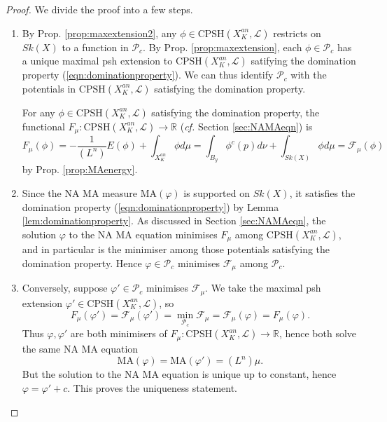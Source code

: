 \documentclass[a4paper]{article}
\theoremstyle{definition}
\newcommand{\cf}{\emph{cf.} }
\newcommand{\R}{\mathbb{R}}
\begin{document}
		
\begin{proof}
We divide the proof into a few steps.

\begin{enumerate}
	\item  By Prop. \ref{prop:maxextension2},  any $\phi\in \text{CPSH}(X_K^{an},\mathcal{L})$ restricts on $Sk(X)$ to a function in $\mathcal{P}_c$. By Prop. \ref{prop:maxextension}, each $\phi\in \mathcal{P}_c$ has a unique maximal psh extension to $\text{CPSH}(X_K^{an},\mathcal{L})$ satifying the domination property (\ref{eqn:dominationproperty}). We can thus identify $\mathcal{P}_c$ with the potentials in $\text{CPSH}(X_K^{an},\mathcal{L})$ satisfying the domination property.
	
	
	
  For any $\phi\in \text{CPSH}(X_K^{an},\mathcal{L})$ satisfying the domination property, 
	the functional  $F_\mu: \text{CPSH}(X_K^{an},\mathcal{L})\to \R$ (\cf Section \ref{sec:NAMAeqn}) is
	\[
F_{\mu}(\phi)= -  \frac{1}{(L^n)} E(\phi)+ \int_{X_K^{an}} \phi d\mu =  \int_{B_y}  \phi^c(p)   d\nu + \int_{Sk(X)} \phi d\mu =\mathcal{F}_\mu(\phi)
	\]
by Prop. \ref{prop:MAenergy}.
	
	
	
	
	\item 
	Since the NA MA measure $\text{MA}(\varphi)$ is supported on $Sk(X)$, it satisfies the domination property (\ref{eqn:dominationproperty}) by Lemma \ref{lem:dominationproperty}. As discussed in Section \ref{sec:NAMAeqn}, the solution $\varphi$ to the NA MA equation minimises  $F_\mu$ among $ \text{CPSH}(X_K^{an},\mathcal{L})$, and in particular is the minimiser among those potentials satisfying the domination property. Hence $\varphi\in \mathcal{P}_c$ minimises $\mathcal{F}_\mu$ among $\mathcal{P}_c$. 
	
	
	\item Conversely, suppose $\varphi'\in \mathcal{P}_c$ minimises $\mathcal{F}_\mu$. We take the maximal psh extension $\varphi'\in  \text{CPSH}(X_K^{an},\mathcal{L})$, so 
	\[
	F_\mu(\varphi')= \mathcal{F}_\mu( \varphi ')= \min_{\mathcal{P}_c} \mathcal{F}_\mu = \mathcal{F}_\mu(\varphi)= F_\mu(\varphi).
	\]
	Thus $\varphi, \varphi'$ are both minimisers of $F_\mu: \text{CPSH}(X_K^{an},\mathcal{L})\to \R$, hence both solve the same NA MA equation
	\[
	\text{MA}(\varphi)= \text{MA}(\varphi')= (L^n) \mu.
	\]
	But the solution to the NA MA equation is unique up to constant, hence $\varphi= \varphi'+c$. This proves the uniqueness statement.
\end{enumerate}



\end{proof}
		
\end{document}

